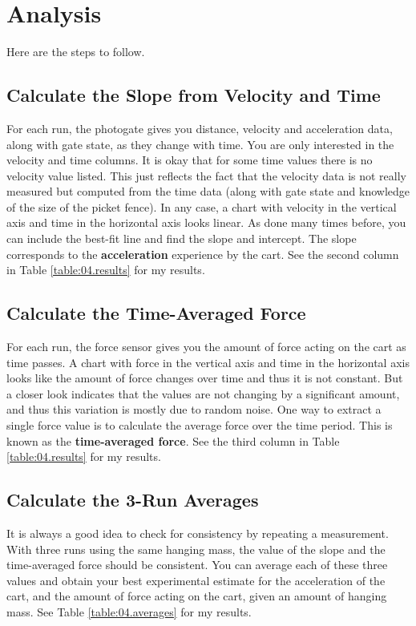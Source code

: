 \section{Analysis}
Here are the steps to follow.
\subsection{Calculate the Slope from Velocity and Time}
For each run, the photogate gives you distance, velocity and acceleration data, along with gate state, as they change with time. You are only interested in the velocity and time columns. It is okay that for some time values there is no velocity value listed. This just reflects the fact that the velocity data is not really measured but computed from the time data (along with gate state and knowledge of the size of the picket fence). In any case, a chart with velocity in the vertical axis and time in the horizontal axis looks linear. As done many times before, you can include the best-fit line and find the slope and intercept. The slope corresponds to the \textbf{acceleration} experience by the cart. See the second column in Table \ref{table:04.results} for my results.
\subsection{Calculate the Time-Averaged Force}
For each run, the force sensor gives you the amount of force acting on the cart as time passes. A chart with force in the vertical axis and time in the horizontal axis looks like the amount of force changes over time and thus it is not constant. But a closer look indicates that the values are not changing by a significant amount, and thus this variation is mostly due to random noise. One way to extract a single force value is to calculate the average force over the time period. This is known as the \textbf{time-averaged force}. See the third column in Table \ref{table:04.results} for my results.
\subsection{Calculate the 3-Run Averages}
It is always a good idea to check for consistency by repeating a measurement. With three runs using the same hanging mass, the value of the slope and the time-averaged force should be consistent. You can average each of these three values and obtain your best experimental estimate for the acceleration of the cart, and the amount of force acting on the cart, given an amount of hanging mass. See Table \ref{table:04.averages} for my results.
